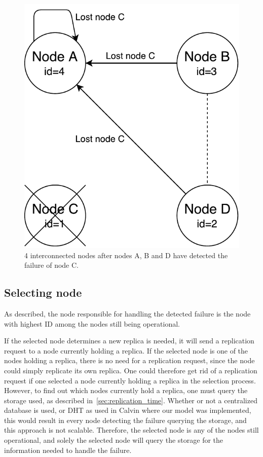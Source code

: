 \documentclass{cslthse-msc}
\begin{document}
\begin{figure}[!hbt]
\centering
\includegraphics[scale=0.5]{images/handling_node_failure.pdf}
\caption[Handling a node failure]{4 interconnected nodes after nodes A, B and D have detected the failure of node C.}\label{fig:handling_node_failure}
\end{figure}

\subsection{Selecting node}
As described, the node responsible for handling the detected failure is the node with highest ID among the nodes still being operational.

If the selected node determines a new replica is needed, it will send a replication request to a node currently holding a replica. If the selected node is one of the nodes holding a replica, there is no need for a replication request, since the node could simply replicate its own replica. One could therefore get rid of a replication request if one selected a node currently holding a replica in the selection process. However, to find out which nodes currently hold a replica, one must query the storage used, as described in~\cref{sec:replication_time}. Whether or not a centralized database is used, or DHT as used in Calvin where our model was implemented, this would result in every node detecting the failure querying the storage, and this approach is not scalable. Therefore, the selected node is any of the nodes still operational, and solely the selected node will query the storage for the information needed to handle the failure.
\end{document}
